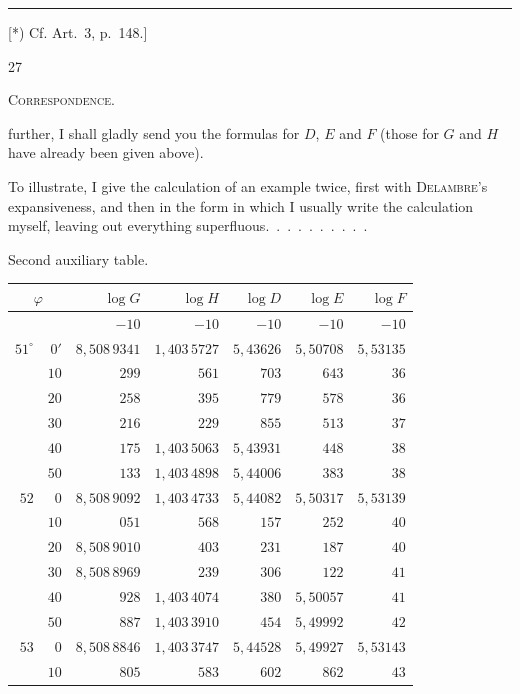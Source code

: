 \par\medskip\noindent\rule{4cm}{.4pt}\par
{\footnotesize [*) Cf. Art.~3, p.~148.]\par}
\vfill{}\hfill27\hfill\mbox{}\par
\clearpage
{}\hfill\textsc{Correspondence.}\hfill\mbox{}\par\medskip
\noindent further, I shall gladly send you the formulas for $D$, $E$ and $F$ (those for $G$ and $H$ have already been given above).

To illustrate, I give the calculation of an example twice, first with \textsc{Delambre}'s expansiveness, and then in the form in which I usually write the calculation myself, leaving out everything superfluous.\ .\ .\ .\ .\ .\ .\ .\ .\ .
\begin{center}
Second auxiliary table.\par\medskip
\begingroup\small\setlength{\tabcolsep}{5pt}\renewcommand{\arraystretch}{1.08}
\begin{tabular}{|r@{\;}r|r|r|r|r|r|}
\hline
\multicolumn{2}{|c|}{$\varphi$}&$\log G$&$\log H$&$\log D$&$\log E$&$\log F$\\\hline\hline
&&$-10$&$-10$&$-10$&$-10$&$-10$\\
$51^\circ$&$0'$&$8{,}508\,9341$&$1{,}403\,5727$&$5{,}43626$&$5{,}50708$&$5{,}53135$\\
&$10$&$299$&$561$&$703$&$643$&$36$\\
&$20$&$258$&$395$&$779$&$578$&$36$\\
&$30$&$216$&$229$&$855$&$513$&$37$\\
&$40$&$175$&$1{,}403\,5063$&$5{,}43931$&$448$&$38$\\
&$50$&$133$&$1{,}403\,4898$&$5{,}44006$&$383$&$38$\\\hline
$52$&$0$&$8{,}508\,9092$&$1{,}403\,4733$&$5{,}44082$&$5{,}50317$&$5{,}53139$\\
&$10$&$051$&$568$&$157$&$252$&$40$\\
&$20$&$8{,}508\,9010$&$403$&$231$&$187$&$40$\\
&$30$&$8{,}508\,8969$&$239$&$306$&$122$&$41$\\
&$40$&$928$&$1{,}403\,4074$&$380$&$5{,}50057$&$41$\\
&$50$&$887$&$1{,}403\,3910$&$454$&$5{,}49992$&$42$\\\hline
$53$&$0$&$8{,}508\,8846$&$1{,}403\,3747$&$5{,}44528$&$5{,}49927$&$5{,}53143$\\
&$10$&$805$&$583$&$602$&$862$&$43$\\

\end{tabular}
\end{center}
